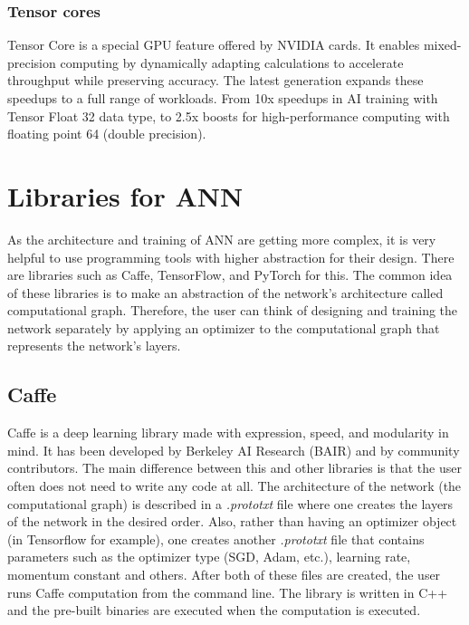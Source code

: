 \subsubsection{Tensor cores}

Tensor Core is a special GPU feature offered by NVIDIA cards. It enables mixed-precision computing by dynamically adapting calculations to accelerate throughput while preserving accuracy. The latest generation expands these speedups to a full range of workloads. From 10x speedups in AI training with Tensor Float 32 data type, to 2.5x boosts for high-performance computing with floating point 64 (double precision). \cite{nvidia}

\newpage
\section{Libraries for ANN}

As the architecture and training of ANN are getting more complex, it is very helpful to use programming tools with higher abstraction for their design. There are libraries such as Caffe, TensorFlow, and PyTorch for this. The common idea of these libraries is to make an abstraction of the network's architecture called computational graph. Therefore, the user can think of designing and training the network separately by applying an optimizer to the computational graph that represents the network's layers. \cite{stanford-L8}

\subsection{Caffe}

Caffe is a deep learning library made with expression, speed, and modularity in mind. It has been developed by Berkeley AI Research (BAIR) and by community contributors. \cite{caffe} The main difference between this and other libraries is that the user often does not need to write any code at all. The architecture of the network (the computational graph) is described in a \textit{.prototxt} file where one creates the layers of the network in the desired order. Also, rather than having an optimizer object (in Tensorflow for example), one creates another \textit{.prototxt} file that contains parameters such as the optimizer type (SGD, Adam, etc.), learning rate, momentum constant and others. After both of these files are created, the user runs Caffe computation from the command line. The library is written in C++ and the pre-built binaries are executed when the computation is executed. \cite{stanford-L8}

